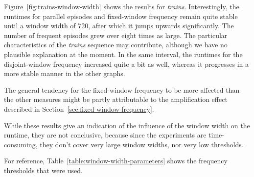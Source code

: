 Figure~\ref{fig:trains-window-width} shows the results for \emph{trains}. Interestingly, the runtimes for parallel episodes and fixed-window frequency remain quite stable until a window width of 720, after which it jumps upwards significantly. The number of frequent episodes grew over eight times as large. The particular characteristics of the \emph{trains} sequence may contribute, although we have no plausible explanation at the moment. In the same interval, the runtimes for the disjoint-window frequency increased quite a bit as well, whereas it progresses in a more stable manner in the other graphs.

The general tendency for the fixed-window frequency to be more affected than the other measures might be partly attributable to the amplification effect described in Section~\ref{sec:fixed-window-frequency}.

While these results give an indication of the influence of the window width on the runtime, they are not conclusive, because since the experiments are time-consuming, they don't cover very large window widths, nor very low thresholds.

For reference, Table~\ref{table:window-width-parameters} shows the frequency thresholds that were used.

